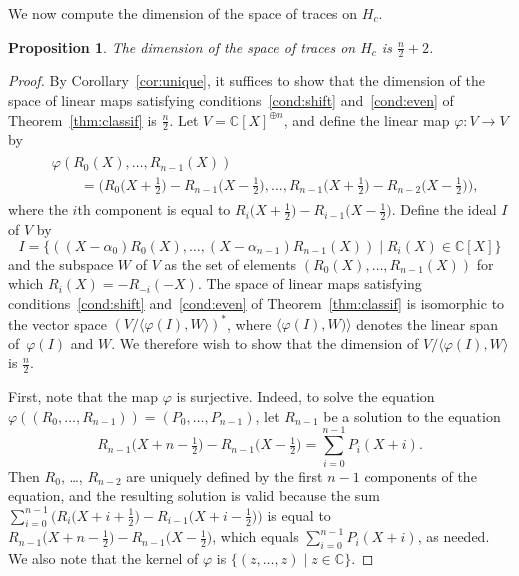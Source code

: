 \documentclass[pdftex]{sigma}
\newcommand\CC{\mathbb{C}}
\newcommand\half{\ensuremath{\frac{1}{2}}}
\newcommand\thalf{\ensuremath{\tfrac12}}
\numberwithin{equation}{section}
\newtheorem{Proposition}[Theorem]{Proposition}
\theoremstyle{definition}
\begin{document}
We now compute the dimension of the space of traces on $H_c$.

\begin{Proposition}
 \label{prop:dim}
 The dimension of the space of traces on $H_c$
 is $\frac{n}{2} + 2$.
\end{Proposition}

\begin{proof}
 By Corollary~\ref{cor:unique},
 it suffices to show that the dimension of the space
 of linear maps satisfying
 conditions~\ref{cond:shift} and~\ref{cond:even}
 of Theorem~\ref{thm:classif}
 is $\frac{n}{2}$.
 Let $V = \CC[X]^{\oplus n}$,
 and define the linear map $\varphi \colon V \to V$ by
 \begin{gather*}
 \begin{split}
& \varphi(R_0 (X), \dots, R_{n - 1} (X)) \\
& \qquad= \bigl(R_0 \bigl(X + \thalf\bigr) - R_{n - 1} \bigl(X - \thalf\bigr), \dots,
 R_{n - 1} \bigl(X + \thalf\bigr) - R_{n - 2} \bigl(X - \thalf\bigr)\bigr),
\end{split}
 \end{gather*}
 where the $i$th component is equal to
 $R_i \bigl(X + \half\bigr) - R_{i - 1} \bigl(X - \thalf\bigr)$.
 Define the ideal $I$ of $V$ by
 \begin{equation*}
 I = \{ ((X - \alpha_0) R_0(X), \dots,
 (X - \alpha_{n - 1}) R_{n - 1}(X)) \mid R_i(X) \in \CC[X] \}
 \end{equation*}
 and the subspace $W$ of $V$ as the set of elements
 $(R_0(X), \dots, R_{n - 1}(X))$
 for which $R_i(X) = -R_{-i}(-X)$.
 The space of linear maps satisfying
 conditions~\ref{cond:shift} and~\ref{cond:even}
 of Theorem~\ref{thm:classif}
 is isomorphic to the vector space
 $(V / \langle \varphi(I), W \rangle)^*$,
 where $\langle \varphi(I), W) \rangle$
 denotes the linear span of~$\varphi(I)$ and $W$.
 We therefore wish to show that the dimension of
 $V / \langle \varphi(I), W \rangle$ is $\frac{n}{2}$.

 First, note that the map $\varphi$ is surjective.
 Indeed, to solve the equation
 $\varphi((R_0, \dots, R_{n - 1})) = (P_0, \dots, P_{n - 1})$,
 let $R_{n - 1}$ be a solution to the equation
 \[R_{n - 1} \bigl(X + n - \thalf\bigr) - R_{n - 1} \bigl(X - \thalf\bigr)
 = \sum_{i = 0}^{n - 1} P_i(X + i).\]
 Then $R_0$, \dots, $R_{n - 2}$ are uniquely defined
 by the first $n - 1$ components of the equation,
 and the resulting solution is valid because
 the sum $\sum_{i = 0}^{n - 1} \bigl(R_i \bigl(X + i + \half\bigr)
 - R_{i - 1} \bigl(X + i - \half\bigr)\bigr)$ is equal to~${R_{n - 1} \bigl(X + n - \half\bigr) - R_{n - 1} \bigl(X - \half\bigr)}$,
 which equals $\sum_{i = 0}^{n - 1} P_i(X + i)$, as needed.
 We also note that the kernel of $\varphi$
 is $\{(z, \dots, z) \mid z \in \CC\}$.


\end{proof}
\end{document}
